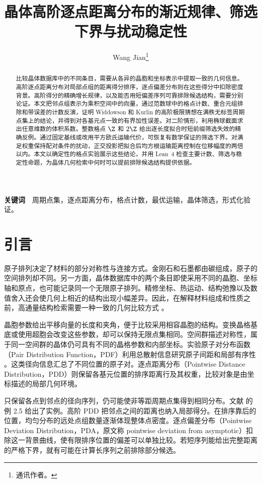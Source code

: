 \documentclass[11pt,a4paper,UTF8,fontset=fandol]{ctexart}
\title{晶体高阶逐点距离分布的渐近规律、筛选下界与扰动稳定性}
\author{Wang Jian\thanks{通讯作者。}}
\date{}
\theoremstyle{definition}
\begin{document}
\maketitle

\begin{abstract}
比较晶体数据库中的不同条目，需要从各异的晶胞和坐标表示中提取一致的几何信息。高阶逐点距离分布对局部点组的距离得分排序，逐点偏差分布则在这些得分中扣除密度背景。高阶得分的精确增长规律，以及能否用短偏差序列可靠排除候选结构，需要分别论证。本文把邻点组表示为乘积空间中的向量，通过范数球中的格点计数、重合元组排除和带误差的计数反演，证明 Widdowson 和 Kurlin 的高阶极限猜想在满秩无标签周期点集上的结论，并得到对各基元点一致的有界加性误差。对二阶情形，利用椭球截面求出任意维数的体积系数。整数格点 \(\Z\) 和 \(2\Z\) 给出逐长度拟合时短前缀筛选失效的精确反例。通过固定基线或改用平方欧氏运输代价，可恢复有数学保证的筛选下界。对满足权重保持配对条件的扰动，正交投影把拟合后均方根运输距离控制在位移幅度的两倍以内。本文以确定性的格点实验展示这些结论，并用 Lean~4 检查主要计数、筛选与稳定性命题，为晶体几何检索中何时可以提前排除候选结构提供依据。
\end{abstract}

\noindent\textbf{关键词}　周期点集，逐点距离分布，格点计数，最优运输，晶体筛选，形式化验证。

\section{引言}\label{sec:intro}

原子排列决定了材料的部分对称性与连接方式。金刚石和石墨都由碳组成，原子的空间排列却不同。另一方面，晶体数据库中的两个条目即使采用不同的晶胞、坐标轴和原点，也可能记录同一个无限原子排列。精修坐标、热运动、结构弛豫以及数值舍入还会使几何上相近的结构出现小幅差异。因此，在解释材料组成和性质之前，高通量结构检索需要一种一致的几何比较方式 \cite{wkpdd,wkhigher}。

晶胞参数给出平移向量的长度和夹角，便于比较采用相容晶胞的结构。变换晶格基底或使用超胞会改变这些参数，却可以保持无限点集相同。空间群描述对称性，属于同一空间群的晶体仍可具有不同的晶格参数和内部坐标。实验原子对分布函数（Pair Distribution Function，PDF）利用总散射信息研究原子间距和局部有序性 \cite{billinge}。这类径向信息汇总了不同位置的原子对。逐点距离分布（Pointwise Distance Distribution，PDD）则保留各基元位置的排序距离行及其权重，比较对象是由坐标描述的局部几何环境。

只保留各点到邻点的径向序列，仍可能使非等距周期点集得到相同分布。文献 \cite{wkhigher} 的例 2.5 给出了实例。高阶 PDD 把邻点之间的距离也纳入局部得分。在排序靠后的位置，均匀分布的远处点组数量逐渐体现整体点密度。逐点偏差分布（Pointwise Deviation Distribution，PDA，原文称 pointwise deviation from asymptotic）扣除这一背景曲线，使有限排序位置的偏差可以单独比较。若短序列能给出完整距离的严格下界，就有可能在计算长序列之前排除部分候选。
\end{document}
